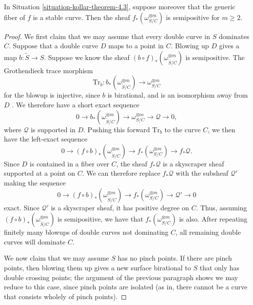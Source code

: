 \begin{theorem}
\label{theorem-rel-dualizing-semipositive}
In Situation \ref{situation-kollar-theorem-4.3}, suppose moreover that the
generic fiber of $f$ is a stable curve.
Then the sheaf $f_*(\omega_{S/C}^{\otimes m})$ is semipositive for $m \geq 2$.
\end{theorem}
\begin{proof}
We first claim that we may assume that every double curve in $S$ dominates $C$.
Suppose that a double curve $D$ maps to a point in $C$.
Blowing up $D$ gives a map $b :
\widetilde{S} \to S$.
Suppose we know the sheaf $(b \circ f)_*(\omega_{\widetilde{S}/C}^{\otimes m})$
is semipositive.
The Grothendieck trace morphism
$$
\mathrm{Tr}_b : b_*(\omega_{\widetilde{S}/C}^{\otimes m})
\longrightarrow \omega_{S/C}^{\otimes m}
$$
for the blowup is injective, since $b$ is birational, and is an isomorphism away
from $D$ \cite[Prop.\ 5.77]{km}.
We therefore have a short exact sequence
$$
0 \longrightarrow b_*(\omega_{\widetilde{S}/C}^{\otimes m})
\longrightarrow \omega_{S/C}^{\otimes m} \longrightarrow \mathcal{Q}
\longrightarrow 0,
$$
where $\mathcal{Q}$ is supported in $D$.
Pushing this forward $\mathrm{Tr}_b$ to the curve $C$, we then have the
left-exact sequence
$$
0 \longrightarrow (f \circ b)_*(\omega_{\widetilde{S}/C}^{\otimes m})
\longrightarrow f_*(\omega_{S/C}^{\otimes m}) \longrightarrow f_*\mathcal{Q}.
$$
Since $D$ is contained in a fiber over $C$, the sheaf $f_*\mathcal{Q}$ is a
skyscraper sheaf supported at a point on $C$.
We can therefore replace $f_*\mathcal{Q}$ with the subsheaf $\mathcal{Q}'$
making the sequence
$$
0 \longrightarrow (f \circ b)_*(\omega_{\widetilde{S}/C}^{\otimes m})
\longrightarrow f_*(\omega_{S/C}^{\otimes m}) \longrightarrow \mathcal{Q}'
\longrightarrow 0
$$
exact.
Since $\mathcal{Q}'$ is a skyscraper sheaf, it has positive degree on $C$.
Thus, assuming $(f \circ b)_*(\omega_{\widetilde{S}/C}^{\otimes m})$ is
semipositive, we have that $f_*(\omega_{S/C}^{\otimes m})$ is also.
After repeating finitely many blowups of double curves not dominating $C$,
all remaining double curves will dominate $C$.

We now claim that we may assume $S$ has no pinch points. If there are pinch
points, then blowing them up gives a new surface birational to $S$ that only has
double crossing points; the argument of the previous paragraph shows we may
reduce to this case, since pinch points are isolated (as in, there cannot be a
curve that consists wholely of pinch points).


\end{proof}

